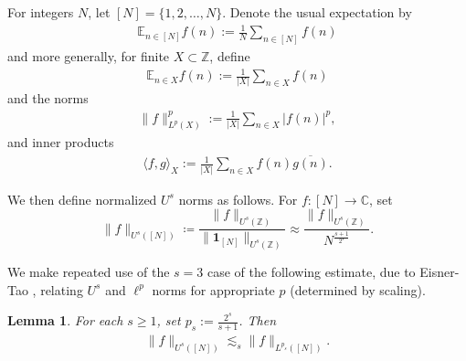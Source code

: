 \documentclass[12pt]{amsart}
\numberwithin{equation}{section}
\newtheorem{lemma}[theorem]{Lemma}
\theoremstyle{definition}
\begin{document}
For integers $N$, let $[N]=\{1,2, \dots, N\}$. 
Denote the usual expectation by 
\begin{align}
 \mathbb{E}_{n \in [N]} f(n) := \frac{1}{N} \sum_{n \in [N]} f(n)\end{align}
and more generally, for finite $X \subset \mathbb{Z}$, define
\begin{align}
 \mathbb{E}_{n \in X} f(n) := \frac{1}{|X|} \sum_{n \in X} f(n) \end{align}
and the norms
\begin{align}
\| f \|_{L^p(X)}^p := \frac{1}{|X|} \sum_{n \in X} |f(n)|^p,
\end{align}
and inner products
\begin{align}\label{e:Innerprod}
    \langle f,g \rangle_X := \frac{1}{|X|} \sum_{n \in X} f(n) \overline{g(n)}.
\end{align}
 
 
We then define normalized $U^s$ norms as follows. For $f \colon [N] \to \mathbb C$, 
set 
\begin{equation}
    \lVert f \rVert_{U^s([N]) } \coloneqq  
    \frac{\| f \|_{U^s(\mathbb{Z})}}{\lVert \mathbf{1}_{[N]} \rVert_{U^s(\mathbb Z) }} \approx \frac{\| f \|_{U^s(\mathbb{Z})}}{N^{\frac{s+1}{2^s}}}.
\end{equation}

We make repeated use of the $s=3$ case of the following estimate, due to Eisner-Tao \cite{ET}, relating $U^s$ and $\ell^p$ norms for appropriate $p$ (determined by scaling).
\begin{lemma}\label{l:ET}
    For each $s \geq 1$, set $p_s := \frac{2^s}{s+1}$. Then
    \begin{align}
        \| f \|_{U^s([N])} \lesssim_s \| f \|_{L^{p_s}([N])}.
    \end{align}
\end{lemma}
\end{document}
